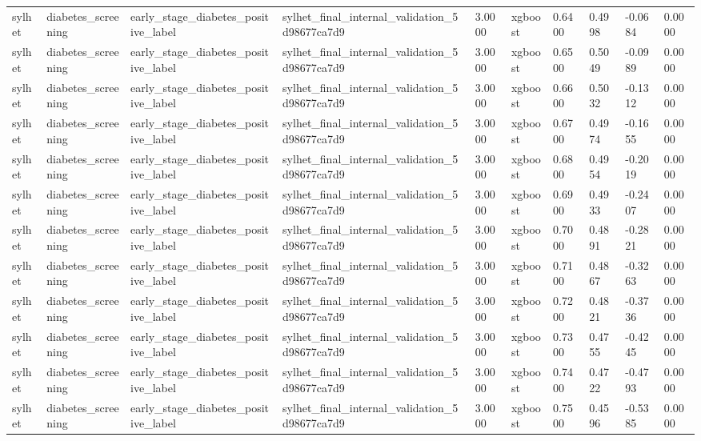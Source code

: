 \begin{tabular}{llllllllll}
sylhet & diabetes\_screening & early\_stage\_diabetes\_positive\_label & sylhet\_final\_internal\_validation\_5d98677ca7d9 & 3.0000 & xgboost & 0.6400 & 0.4998 & -0.0684 & 0.0000 \\
sylhet & diabetes\_screening & early\_stage\_diabetes\_positive\_label & sylhet\_final\_internal\_validation\_5d98677ca7d9 & 3.0000 & xgboost & 0.6500 & 0.5049 & -0.0989 & 0.0000 \\
sylhet & diabetes\_screening & early\_stage\_diabetes\_positive\_label & sylhet\_final\_internal\_validation\_5d98677ca7d9 & 3.0000 & xgboost & 0.6600 & 0.5032 & -0.1312 & 0.0000 \\
sylhet & diabetes\_screening & early\_stage\_diabetes\_positive\_label & sylhet\_final\_internal\_validation\_5d98677ca7d9 & 3.0000 & xgboost & 0.6700 & 0.4974 & -0.1655 & 0.0000 \\
sylhet & diabetes\_screening & early\_stage\_diabetes\_positive\_label & sylhet\_final\_internal\_validation\_5d98677ca7d9 & 3.0000 & xgboost & 0.6800 & 0.4954 & -0.2019 & 0.0000 \\
sylhet & diabetes\_screening & early\_stage\_diabetes\_positive\_label & sylhet\_final\_internal\_validation\_5d98677ca7d9 & 3.0000 & xgboost & 0.6900 & 0.4933 & -0.2407 & 0.0000 \\
sylhet & diabetes\_screening & early\_stage\_diabetes\_positive\_label & sylhet\_final\_internal\_validation\_5d98677ca7d9 & 3.0000 & xgboost & 0.7000 & 0.4891 & -0.2821 & 0.0000 \\
sylhet & diabetes\_screening & early\_stage\_diabetes\_positive\_label & sylhet\_final\_internal\_validation\_5d98677ca7d9 & 3.0000 & xgboost & 0.7100 & 0.4867 & -0.3263 & 0.0000 \\
sylhet & diabetes\_screening & early\_stage\_diabetes\_positive\_label & sylhet\_final\_internal\_validation\_5d98677ca7d9 & 3.0000 & xgboost & 0.7200 & 0.4821 & -0.3736 & 0.0000 \\
sylhet & diabetes\_screening & early\_stage\_diabetes\_positive\_label & sylhet\_final\_internal\_validation\_5d98677ca7d9 & 3.0000 & xgboost & 0.7300 & 0.4755 & -0.4245 & 0.0000 \\
sylhet & diabetes\_screening & early\_stage\_diabetes\_positive\_label & sylhet\_final\_internal\_validation\_5d98677ca7d9 & 3.0000 & xgboost & 0.7400 & 0.4722 & -0.4793 & 0.0000 \\
sylhet & diabetes\_screening & early\_stage\_diabetes\_positive\_label & sylhet\_final\_internal\_validation\_5d98677ca7d9 & 3.0000 & xgboost & 0.7500 & 0.4596 & -0.5385 & 0.0000 \\

\end{tabular}
